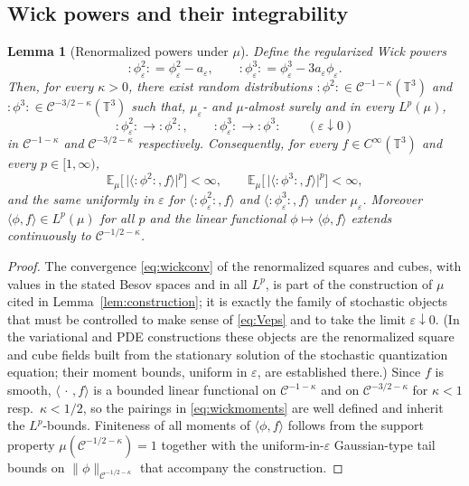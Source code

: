 \documentclass[12pt]{article}
\newtheorem{lemma}{Lemma}
\theoremstyle{definition}
\newcommand{\T}{\mathbb{T}^3}
\newcommand{\E}{\mathbb{E}}
\newcommand{\Wick}[1]{{:}#1{:}}
\begin{document}
\subsection{Wick powers and their integrability}

\begin{lemma}[Renormalized powers under $\mu$]\label{lem:wick}
Define the regularized Wick powers
\begin{equation}\label{eq:wickdef}
  \Wick{\phi_\varepsilon^2}=\phi_\varepsilon^2-a_\varepsilon,\qquad
  \Wick{\phi_\varepsilon^3}=\phi_\varepsilon^3-3a_\varepsilon\phi_\varepsilon .
\end{equation}
Then, for every $\kappa>0$, there exist random distributions
$\Wick{\phi^2}\in\mathcal C^{-1-\kappa}(\T)$ and
$\Wick{\phi^3}\in\mathcal C^{-3/2-\kappa}(\T)$ such that, $\mu_\varepsilon$- and
$\mu$-almost surely and in every $L^p(\mu)$,
\begin{equation}\label{eq:wickconv}
  \Wick{\phi_\varepsilon^2}\to\Wick{\phi^2},\qquad
  \Wick{\phi_\varepsilon^3}\to\Wick{\phi^3}\qquad(\varepsilon\downarrow0)
\end{equation}
in $\mathcal C^{-1-\kappa}$ and $\mathcal C^{-3/2-\kappa}$ respectively. Consequently, for
every $f\in C^\infty(\T)$ and every $p\in[1,\infty)$,
\begin{equation}\label{eq:wickmoments}
  \E_\mu\Big[\,\big|\langle \Wick{\phi^2},f\rangle\big|^p\Big]<\infty,\qquad
  \E_\mu\Big[\,\big|\langle \Wick{\phi^3},f\rangle\big|^p\Big]<\infty,
\end{equation}
and the same uniformly in $\varepsilon$ for $\langle\Wick{\phi_\varepsilon^2},f\rangle$
and $\langle\Wick{\phi_\varepsilon^3},f\rangle$ under $\mu_\varepsilon$. Moreover
$\langle\phi,f\rangle\in L^p(\mu)$ for all $p$ and the linear functional
$\phi\mapsto\langle\phi,f\rangle$ extends continuously to $\mathcal C^{-1/2-\kappa}$.
\end{lemma}

\begin{proof}
The convergence \eqref{eq:wickconv} of the renormalized squares and cubes, with values in
the stated Besov spaces and in all $L^p$, is part of the construction of $\mu$ cited in
Lemma~\ref{lem:construction}; it is exactly the family of stochastic objects that must be
controlled to make sense of \eqref{eq:Veps} and to take the limit
$\varepsilon\downarrow0$. (In the variational and PDE constructions these objects are the
renormalized square and cube fields built from the stationary solution of the stochastic
quantization equation; their moment bounds, uniform in $\varepsilon$, are established
there.) Since $f$ is smooth, $\langle\,\cdot\,,f\rangle$ is a bounded linear functional on
$\mathcal C^{-1-\kappa}$ and on $\mathcal C^{-3/2-\kappa}$ for $\kappa<1$ resp.\ $\kappa<1/2$,
so the pairings in \eqref{eq:wickmoments} are well defined and inherit the
$L^p$-bounds. Finiteness of all moments of $\langle\phi,f\rangle$ follows from the
support property $\mu(\mathcal C^{-1/2-\kappa})=1$ together with the uniform-in-$\varepsilon$
Gaussian-type tail bounds on $\|\phi\|_{\mathcal C^{-1/2-\kappa}}$ that accompany the
construction.
\end{proof}
\end{document}
